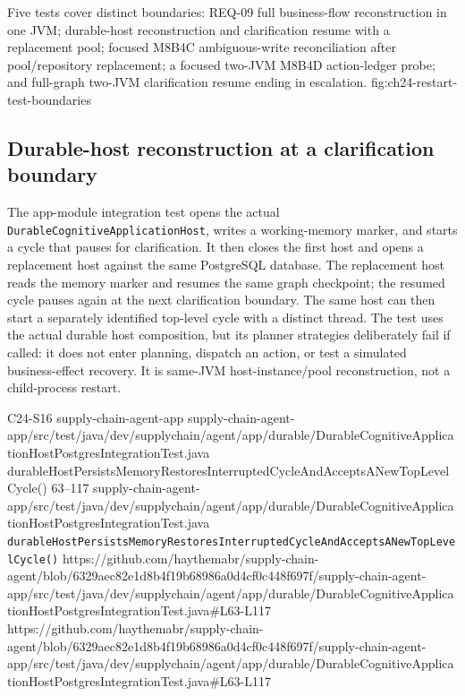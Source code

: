   {Five tests cover distinct boundaries: REQ-09 full business-flow reconstruction in one JVM; durable-host reconstruction and clarification resume with a replacement pool; focused M8B4C ambiguous-write reconciliation after pool/repository replacement; a focused two-JVM M8B4D action-ledger probe; and full-graph two-JVM clarification resume ending in escalation.}
  {fig:ch24-restart-test-boundaries}

\subsection{Durable-host reconstruction at a clarification boundary}

The app-module integration test opens the actual \texttt{DurableCognitive\allowbreak{}ApplicationHost}, writes a working-memory marker, and starts a cycle that pauses for clarification. It then closes the first host and opens a replacement host against the same PostgreSQL database. The replacement host reads the memory marker and resumes the same graph checkpoint; the resumed cycle pauses again at the next clarification boundary. The same host can then start a separately identified top-level cycle with a distinct thread. The test uses the actual durable host composition, but its planner strategies deliberately fail if called: it does not enter planning, dispatch an action, or test a simulated business-effect recovery. It is same-JVM host-instance/pool reconstruction, not a child-process restart.

\BookSourceReferenceNoQR
  {C24-S16}
  {supply-chain-agent-app}
  {supply-chain-agent-app/src/test/java/dev/supplychain/agent/app/durable/DurableCognitiveApplicationHostPostgresIntegrationTest.java}
  {durableHostPersistsMemoryRestoresInterruptedCycleAndAcceptsANewTopLevelCycle()}
  {63--117}
  {supply-chain-agent-app/src/test/java/dev/supplychain/agent/app/durable/DurableCognitiveApplicationHostPostgresIntegrationTest.java}
  {\texttt{durableHostPersistsMemoryRestoresInterruptedCycleAndAcceptsANewTopLevelCycle()}}
  {https://github.com/haythemabr/supply-chain-agent/blob/6329aec82e1d8b4f19b68986a0d4cf0c448f697f/supply-chain-agent-app/src/test/java/dev/supplychain/agent/app/durable/DurableCognitiveApplicationHostPostgresIntegrationTest.java\#L63-L117}
  {https://github.com/haythemabr/supply-chain-agent/blob/6329aec82e1d8b4f19b68986a0d4cf0c448f697f/supply-chain-agent-app/src/test/java/dev/supplychain/agent/app/durable/DurableCognitiveApplicationHostPostgresIntegrationTest.java\#L63-L117}

